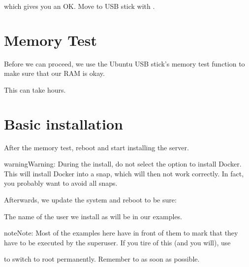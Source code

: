 \documentclass[a4paper,10pt,english]{sphinxmanual}
\begin{document}
\begin{sphinxVerbatim}[commandchars=\\\{\}]
    
\end{sphinxVerbatim}

which gives you an OK. Move to USB stick with .


\section{Memory Test}
\label{\detokenize{os:memory-test}}
Before we can proceed, we use the Ubuntu USB stick’s memory test function to
make sure that our RAM is okay.


This can take hours.


\section{Basic installation}
\label{\detokenize{os:basic-installation}}
After the memory test, reboot and start installing the server.

\begin{sphinxadmonition}{warning}{Warning:}
During the install, do not select the option to install Docker.
This will install Docker into a snap, which will then not work correctly.
In fact, you probably want to avoid all snaps.
\end{sphinxadmonition}

Afterwards, we update the system and reboot to be sure:

\begin{sphinxVerbatim}[commandchars=\\\{\}]
  
  
 
\end{sphinxVerbatim}

The name of the user we install as will be  in our examples.

\begin{sphinxadmonition}{note}{Note:}
Most of the examples here have  in front of them to mark that
they have to be executed by the superuser. If you tire of this (and you
will), use

\begin{sphinxVerbatim}[commandchars=\\\{\}]
  
\end{sphinxVerbatim}

to switch to root permanently. Remember to  as soon as possible.
\end{sphinxadmonition}
\end{document}
